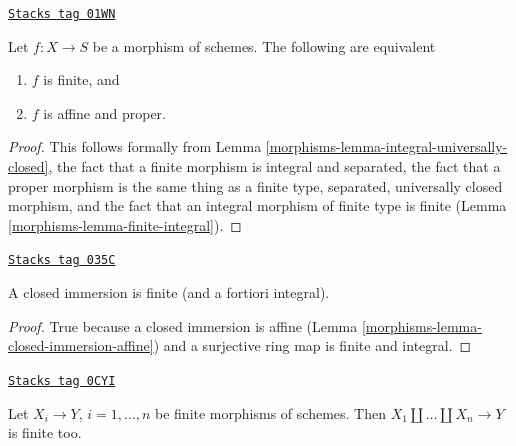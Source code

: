 \begin{lemma}
\label{morphisms-lemma-finite-proper}
\href{https://stacks.math.columbia.edu/tag/01WN}{\texttt{Stacks tag 01WN}}

Let $f : X \to S$ be a morphism of schemes. The following are equivalent
\begin{enumerate}
\item $f$ is finite, and
\item $f$ is affine and proper.
\end{enumerate}
\end{lemma}

\begin{proof}

This follows formally from
Lemma \ref{morphisms-lemma-integral-universally-closed},
the fact that a finite morphism is integral and separated,
the fact that a proper morphism is the same thing as
a finite type, separated, universally closed morphism,
and the fact that an integral morphism of finite type is
finite (Lemma \ref{morphisms-lemma-finite-integral}).
\end{proof}

\begin{lemma}
\label{morphisms-lemma-closed-immersion-finite}
\href{https://stacks.math.columbia.edu/tag/035C}{\texttt{Stacks tag 035C}}

A closed immersion is finite (and a fortiori integral).
\end{lemma}

\begin{proof}

True because a closed immersion is affine
(Lemma \ref{morphisms-lemma-closed-immersion-affine})
and a surjective ring map is finite and integral.
\end{proof}

\begin{lemma}
\label{morphisms-lemma-finite-union-finite}
\href{https://stacks.math.columbia.edu/tag/0CYI}{\texttt{Stacks tag 0CYI}}

Let $X_i \to Y$, $i = 1, \ldots, n$ be finite morphisms of schemes.
Then $X_1 \amalg \ldots \amalg X_n \to Y$ is finite too.
\end{lemma}

